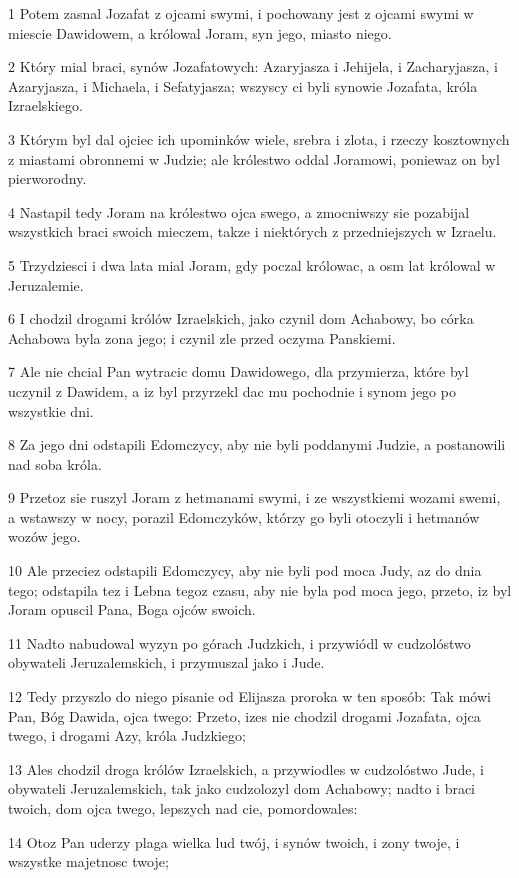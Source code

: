 \par 1 Potem zasnal Jozafat z ojcami swymi, i pochowany jest z ojcami swymi w miescie Dawidowem, a królowal Joram, syn jego, miasto niego.
\par 2 Który mial braci, synów Jozafatowych: Azaryjasza i Jehijela, i Zacharyjasza, i Azaryjasza, i Michaela, i Sefatyjasza; wszyscy ci byli synowie Jozafata, króla Izraelskiego.
\par 3 Którym byl dal ojciec ich upominków wiele, srebra i zlota, i rzeczy kosztownych z miastami obronnemi w Judzie; ale królestwo oddal Joramowi, poniewaz on byl pierworodny.
\par 4 Nastapil tedy Joram na królestwo ojca swego, a zmocniwszy sie pozabijal wszystkich braci swoich mieczem, takze i niektórych z przedniejszych w Izraelu.
\par 5 Trzydziesci i dwa lata mial Joram, gdy poczal królowac, a osm lat królowal w Jeruzalemie.
\par 6 I chodzil drogami królów Izraelskich, jako czynil dom Achabowy, bo córka Achabowa byla zona jego; i czynil zle przed oczyma Panskiemi.
\par 7 Ale nie chcial Pan wytracic domu Dawidowego, dla przymierza, które byl uczynil z Dawidem, a iz byl przyrzekl dac mu pochodnie i synom jego po wszystkie dni.
\par 8 Za jego dni odstapili Edomczycy, aby nie byli poddanymi Judzie, a postanowili nad soba króla.
\par 9 Przetoz sie ruszyl Joram z hetmanami swymi, i ze wszystkiemi wozami swemi, a wstawszy w nocy, porazil Edomczyków, którzy go byli otoczyli i hetmanów wozów jego.
\par 10 Ale przeciez odstapili Edomczycy, aby nie byli pod moca Judy, az do dnia tego; odstapila tez i Lebna tegoz czasu, aby nie byla pod moca jego, przeto, iz byl Joram opuscil Pana, Boga ojców swoich.
\par 11 Nadto nabudowal wyzyn po górach Judzkich, i przywiódl w cudzolóstwo obywateli Jeruzalemskich, i przymuszal jako i Jude.
\par 12 Tedy przyszlo do niego pisanie od Elijasza proroka w ten sposób: Tak mówi Pan, Bóg Dawida, ojca twego: Przeto, izes nie chodzil drogami Jozafata, ojca twego, i drogami Azy, króla Judzkiego;
\par 13 Ales chodzil droga królów Izraelskich, a przywiodles w cudzolóstwo Jude, i obywateli Jeruzalemskich, tak jako cudzolozyl dom Achabowy; nadto i braci twoich, dom ojca twego, lepszych nad cie, pomordowales:
\par 14 Otoz Pan uderzy plaga wielka lud twój, i synów twoich, i zony twoje, i wszystke majetnosc twoje;
